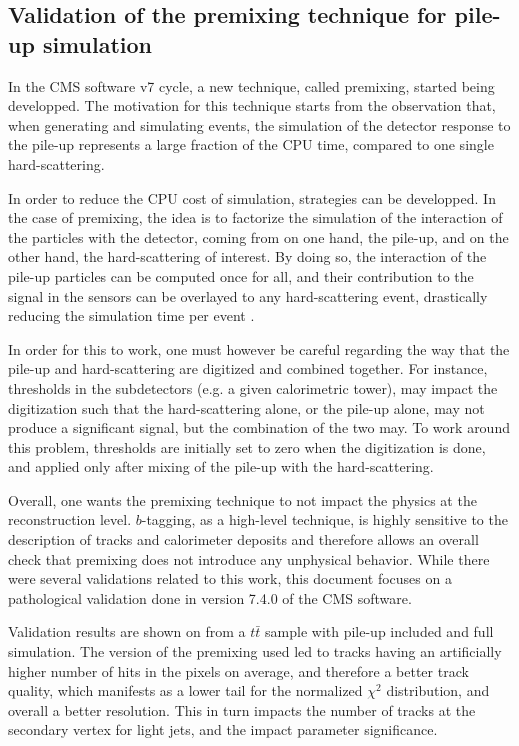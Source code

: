     \subsection{Validation of the premixing technique for pile-up simulation}

    In the CMS software v7 cycle, a new technique, called premixing, started being developped.
    The motivation for this technique starts from the observation that, when generating and
    simulating events, the simulation of the detector response to the pile-up represents
    a large fraction of the CPU time, compared to one single hard-scattering.

    In order to reduce the CPU cost of simulation, strategies can be developped. In the
    case of premixing, the idea is to factorize the simulation of the interaction of the particles with the
    detector, coming from on one hand, the pile-up, and on the other hand, the hard-scattering
    of interest. By doing so, the interaction of the pile-up particles can be computed once for
    all, and their contribution to the signal in the sensors can be overlayed to any
    hard-scattering event, drastically reducing the simulation time per event \cite{Premixing}.

    In order for this to work, one must however be careful regarding the way that the
    pile-up and hard-scattering are digitized and combined together. For instance,
    thresholds in the subdetectors (e.g. a given calorimetric tower), may
    impact the digitization such that the hard-scattering alone, or the pile-up alone,
    may not produce a significant signal, but the combination of the two may. To
    work around this problem, thresholds are initially set to zero when the digitization
    is done, and applied only after mixing of the pile-up with the hard-scattering.

    Overall, one wants the premixing technique to not impact the physics at the reconstruction
    level. $b$-tagging, as a high-level technique, is highly sensitive to the description
    of tracks and calorimeter deposits and therefore allows an overall check that premixing does
    not introduce any unphysical behavior. While there were several validations related to
    this work, this document focuses on a pathological validation done in version 7.4.0
    of the CMS software.

    Validation results are shown on  from
    a $t\bar{t}$ sample with pile-up included and full simulation. The version of the
    premixing used led to tracks having an artificially higher number of hits in the
    pixels on average, and therefore a better track quality, which manifests as a lower
    tail for the normalized $\chi^2$ distribution, and overall a better resolution.
    This in turn impacts the number of tracks at the secondary vertex for light jets, and the
    impact parameter significance.


